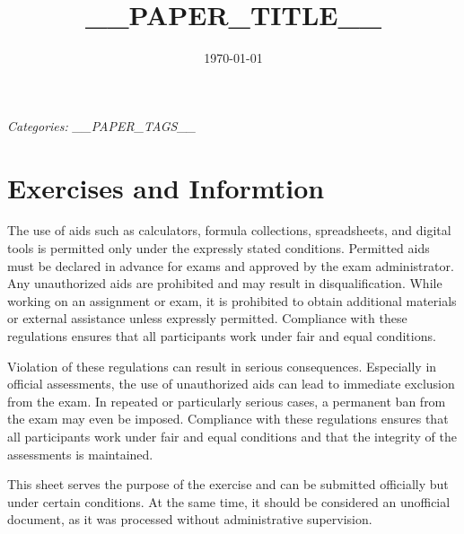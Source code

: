\documentclass{banko}
\title{__PAPER_TITLE__}
\date{\today}
\begin{document}
\maketitle

\romanPage

\tableofcontents

\textit{Categories: __PAPER_TAGS__}

\clearpage
\arabicPage

\togglelayout

\section{Exercises and Informtion}

The use of aids such as calculators, formula collections, spreadsheets, and digital tools is permitted only under the expressly stated conditions. Permitted aids must be declared in advance for exams and approved by the exam administrator. Any unauthorized aids are prohibited and may result in disqualification. While working on an assignment or exam, it is prohibited to obtain additional materials or external assistance unless expressly permitted. Compliance with these regulations ensures that all participants work under fair and equal conditions.

Violation of these regulations can result in serious consequences. Especially in official assessments, the use of unauthorized aids can lead to immediate exclusion from the exam. In repeated or particularly serious cases, a permanent ban from the exam may even be imposed. Compliance with these regulations ensures that all participants work under fair and equal conditions and that the integrity of the assessments is maintained.

This sheet serves the purpose of the exercise and can be submitted officially but under certain conditions. At the same time, it should be considered an unofficial document, as it was processed without administrative supervision.
\end{document}
